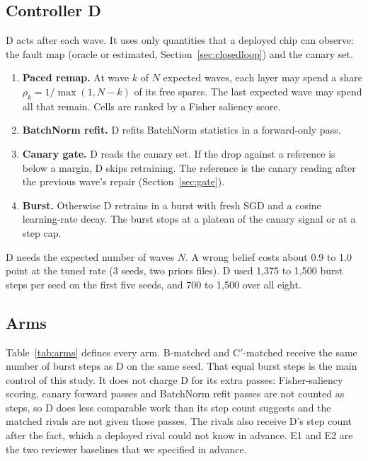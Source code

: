 \documentclass[journal]{IEEEtran}
\begin{document}
\subsection{Controller D}
\label{sec:controllerd}
D acts after each wave.
It uses only quantities that a deployed chip can observe: the fault map (oracle or estimated, Section~\ref{sec:closedloop}) and the canary set.
\begin{enumerate}
\item \textbf{Paced remap.}
At wave $k$ of $N$ expected waves, each layer may spend a share $\rho_k = 1/\max(1, N-k)$ of its free spares.
The last expected wave may spend all that remain.
Cells are ranked by a Fisher saliency score.
\item \textbf{BatchNorm refit.}
D refits BatchNorm statistics in a forward-only pass.
\item \textbf{Canary gate.}
D reads the canary set.
If the drop against a reference is below a margin, D skips retraining.
The reference is the canary reading after the previous wave's repair (Section~\ref{sec:gate}).
\item \textbf{Burst.}
Otherwise D retrains in a burst with fresh SGD and a cosine learning-rate decay.
The burst stops at a plateau of the canary signal or at a step cap.
\end{enumerate}
D needs the expected number of waves $N$.
A wrong belief costs about 0.9 to 1.0 point at the tuned rate (3 seeds, two priors files).
D used 1,375 to 1,500 burst steps per seed on the first five seeds, and 700 to 1,500 over all eight.

\subsection{Arms}
Table~\ref{tab:arms} defines every arm.
B-matched and C$'$-matched receive the same number of burst steps as D on the same seed.
That equal burst steps is the main control of this study.
It does not charge D for its extra passes: Fisher-saliency scoring, canary forward passes and BatchNorm refit passes are not counted as steps, so D does less comparable work than its step count suggests and the matched rivals are not given those passes.
The rivals also receive D's step count after the fact, which a deployed rival could not know in advance.
E1 and E2 are the two reviewer baselines that we specified in advance.
\end{document}
